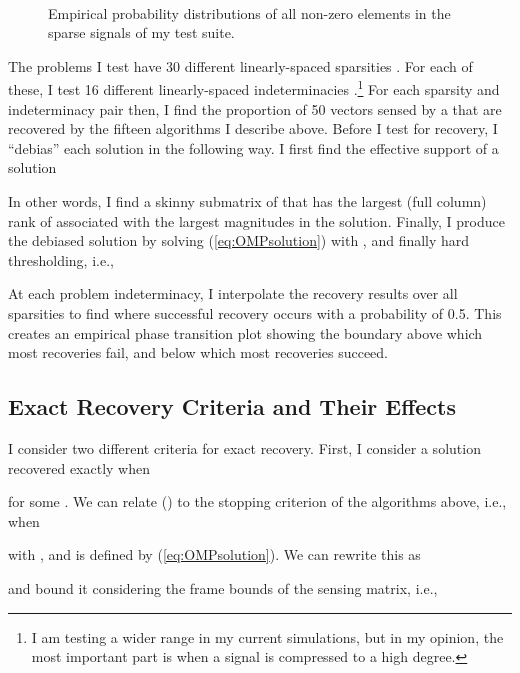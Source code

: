 \documentclass[11pt,draftcls,onecolumn]{IEEEtran}
\begin{document}
\begin{figure}[t]
\centering
{}\hspace{-0.1in}
\\ \vspace{-0.1in}
\caption{Empirical probability distributions of all 
non-zero elements in the sparse signals of my test suite.}
\label{fig:empiricalPDFs}
\end{figure}

The problems I test have 30 different linearly-spaced sparsities .
For each of these, I test 16 different linearly-spaced indeterminacies .\footnote{I am testing a
wider range in my current simulations, but in my opinion, 
the most important part is when a signal is compressed to a high degree.}
For each sparsity and indeterminacy pair then,
I find the proportion of 50 vectors sensed by a  that are recovered 
by the fifteen algorithms I describe above.
Before I test for recovery, I ``debias'' \cite{Figueiredo2007}
each solution in the following way.
I first find the effective support of a solution 

In other words, I find a skinny submatrix of  that has the
largest (full column) rank of  associated with the  largest magnitudes in the solution.
Finally, I produce the debiased solution by solving (\ref{eq:OMPsolution})
with ,
and finally hard thresholding, i.e., 

At each problem indeterminacy,
I interpolate the recovery results over all sparsities to find 
where successful recovery occurs with a probability of 0.5.
This creates an empirical phase transition plot showing the boundary
above which most recoveries fail, and below which most recoveries succeed.

\subsection{Exact Recovery Criteria and Their Effects}
I consider two different criteria for exact recovery.
First, I consider a solution recovered exactly when 

for some .
We can relate () to the stopping criterion
of the algorithms above, i.e., when

with ,
and  is defined by (\ref{eq:OMPsolution}).
We can rewrite this as

and bound it considering the frame bounds of the sensing matrix, i.e., 
\end{document}
